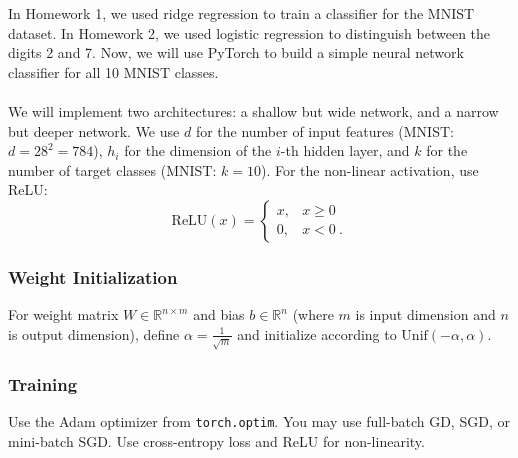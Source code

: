 \documentclass{article}
\begin{document}
\begin{aprob}
    \label{code-nn-mnist}
    In Homework 1, we used ridge regression to train a classifier for the MNIST dataset.
    In Homework 2, we used logistic regression to distinguish between the digits 2 and 7.
    Now, we will use PyTorch to build a simple neural network classifier for all 10 MNIST classes.\\\\
    We will implement two architectures: a shallow but wide network, and a narrow but deeper network.
    We use $d$ for the number of input features (MNIST: $d=28^2 = 784$), $h_i$ for the dimension of the $i$-th hidden layer, and $k$ for the number of target classes (MNIST: $k=10$).
    For the non-linear activation, use ReLU:
    \[ \text{ReLU}(x) = \begin{cases}
          x, & x \geq 0 \\
          0, & x < 0 \ .
       \end{cases}
    \]
    \subsubsection*{Weight Initialization}
    For weight matrix $W \in \mathbb{R}^{n \times m}$ and bias $b \in \mathbb{R}^n$ (where $m$ is input dimension and $n$ is output dimension), define $\alpha = \frac{1}{\sqrt{m}}$ and initialize according to $\text{Unif}(-\alpha, \alpha)$.

    \subsubsection*{Training}
    Use the Adam optimizer from \texttt{torch.optim}. You may use full-batch GD, SGD, or mini-batch SGD. Use cross-entropy loss and ReLU for non-linearity.


\end{aprob}
\end{document}

